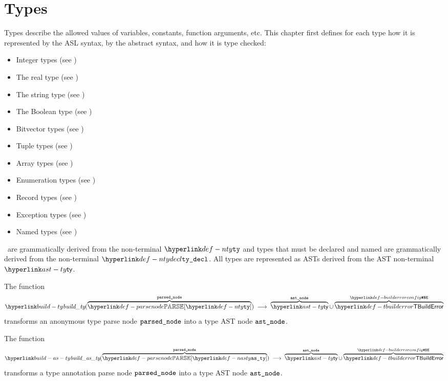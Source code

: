 \chapter{Types\label{chap:Types}}

Types describe the allowed values of variables, constants, function arguments, etc.
This chapter first defines for each type how it is represented by the ASL syntax,
by the abstract syntax, and how it is type checked:
\begin{itemize}
  \item Integer types (see )
  \item The real type (see )
  \item The string type (see )
  \item The Boolean type (see )
  \item Bitvector types (see )
  \item Tuple types (see )
  \item Array types (see )
  \item Enumeration types (see )
  \item Record types (see )
  \item Exception types (see )
  \item Named types (see )
\end{itemize}

\Anonymoustypes\ are grammatically derived from the non-terminal $\Nty$
and types that must be declared and named are grammatically derived from the non-terminal $\Ntydecl$.
All types are represented as ASTs derived from the AST non-terminal $\ty$.

\hypertarget{build-ty}{}
The function
\[
  \buildty(\overname{\parsenode{\Nty}}{\vparsednode}) \;\aslto\; \overname{\ty}{\vastnode}
  \cup \overname{\TBuildError}{\BuildErrorConfig}
\]
transforms an anonymous type parse node $\texttt{parsed\_node}$ into a type AST node $\texttt{ast\_node}$.
\ProseOtherwiseBuildError

\hypertarget{build-as-ty}{}
The function
\[
  \buildasty(\overname{\parsenode{\Nasty}}{\vparsednode}) \;\aslto\; \overname{\ty}{\vastnode}
  \cup \overname{\TBuildError}{\BuildErrorConfig}
\]
transforms a type annotation parse node $\texttt{parsed\_node}$ into a type AST node $\texttt{ast\_node}$.
\ProseOtherwiseBuildError

